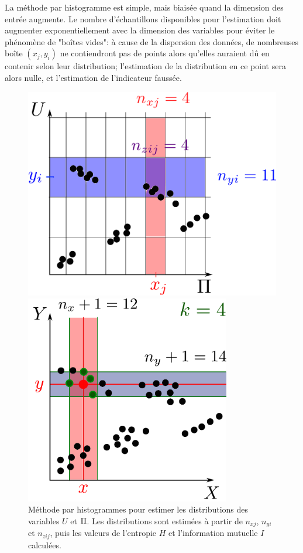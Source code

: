 La méthode par histogramme est simple, mais biaisée quand la dimension des entrée augmente.
Le nombre d'échantillons disponibles pour l'estimation doit augmenter exponentiellement avec la dimension des variables pour éviter le phénomène de "boîtes vides": à cause de la dispersion des données, de nombreuses boîte $(x_j,y_i)$ ne contiendront pas de points alors qu'elles auraient dû en contenir selon leur distribution; l'estimation de la distribution en ce point sera alors nulle, et l'estimation de l'indicateur faussée.
\begin{figure}
\begin{minipage}{0.4\textwidth}
\centering
\includegraphics[width=\textwidth]{boxes}
\caption{Méthode par histogrammes pour estimer les distributions des variables $U$ et $\Pi$. Les distributions sont estimées à partir de $n_{xj}$, $n_{yi}$ et $n_{zij}$, puis les valeurs de l'entropie $H$ et l'information mutuelle $I$ calculées.}
\label{fig:binning}  
\end{minipage}
\hfill
\begin{minipage}{0.4\textwidth}    
        \centering
        \includegraphics[width=0.8\textwidth]{kraskov.pdf}

\end{minipage}
\end{figure}
